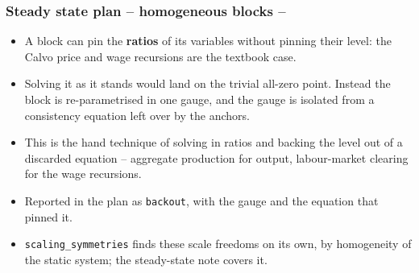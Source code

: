 \documentclass[10pt,slidestop]{beamer}
\theoremstyle{plain}
\begin{document}
\begin{frame}[c,fragile]
  \frametitle{Steady state plan -- homogeneous blocks --}

  \begin{itemize}

  \item A block can pin the \textbf{ratios} of its variables without pinning
    their level: the Calvo price and wage recursions are the textbook case.\newline

  \item Solving it as it stands would land on the trivial all-zero point.
    Instead the block is re-parametrised in one gauge, and the gauge is isolated
    from a consistency equation left over by the anchors.\newline

  \item This is the hand technique of solving in ratios and backing the level
    out of a discarded equation -- aggregate production for output,
    labour-market clearing for the wage recursions.\newline

  \item Reported in the plan as \verb+backout+, with the gauge and the equation
    that pinned it.\newline

  \item \verb+scaling_symmetries+ finds these scale freedoms on its own, by homogeneity
    of the static system; the steady-state note covers it.

  \end{itemize}

\end{frame}


\end{document}
